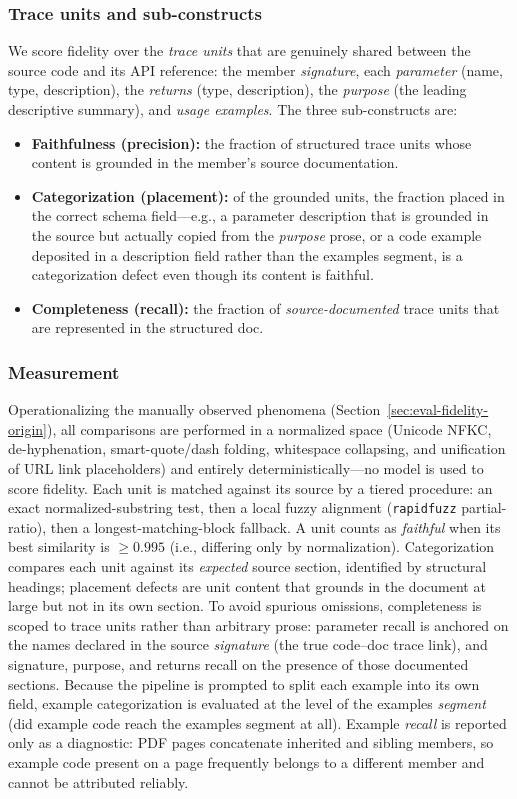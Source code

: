 \subsubsection{Trace units and sub-constructs}
We score fidelity over the \emph{trace units} that are genuinely shared between
the source code and its API reference: the member \emph{signature}, each
\emph{parameter} (name, type, description), the \emph{returns} (type,
description), the \emph{purpose} (the leading descriptive summary), and
\emph{usage examples}. The three sub-constructs are:
\begin{itemize}
  \item \textbf{Faithfulness (precision):} the fraction of structured trace
  units whose content is grounded in the member's source documentation.
  \item \textbf{Categorization (placement):} of the grounded units, the fraction
  placed in the correct schema field---e.g., a parameter description that is
  grounded in the source but actually copied from the \emph{purpose} prose, or a
  code example deposited in a description field rather than the examples segment,
  is a categorization defect even though its content is faithful.
  \item \textbf{Completeness (recall):} the fraction of \emph{source-documented}
  trace units that are represented in the structured doc.
\end{itemize}

\subsubsection{Measurement}
Operationalizing the manually observed phenomena
(Section~\ref{sec:eval-fidelity-origin}), all comparisons are performed in a
normalized space (Unicode NFKC, de-hyphenation, smart-quote/dash folding,
whitespace collapsing, and unification of URL link placeholders) and entirely
deterministically---no model is used to score fidelity. Each unit is matched against its source by a tiered
procedure: an exact normalized-substring test, then a local fuzzy alignment
(\texttt{rapidfuzz} partial-ratio), then a longest-matching-block fallback. A
unit counts as \emph{faithful} when its best similarity is
$\geq 0.995$ (i.e., differing only by normalization). Categorization compares
each unit against its \emph{expected} source section, identified by structural
headings; placement defects are unit content that grounds in the document at
large but not in its own section. To avoid spurious omissions, completeness is
scoped to trace units rather than arbitrary prose: parameter recall is anchored
on the names declared in the source \emph{signature} (the true code--doc trace
link), and signature, purpose, and returns recall on the presence of those
documented sections. Because the pipeline is prompted to split each example into
its own field, example categorization is evaluated at the level of the examples
\emph{segment} (did example code reach the examples segment at all). Example
\emph{recall} is reported only as a diagnostic: PDF pages concatenate inherited
and sibling members, so example code present on a page frequently belongs to a
different member and cannot be attributed reliably.

